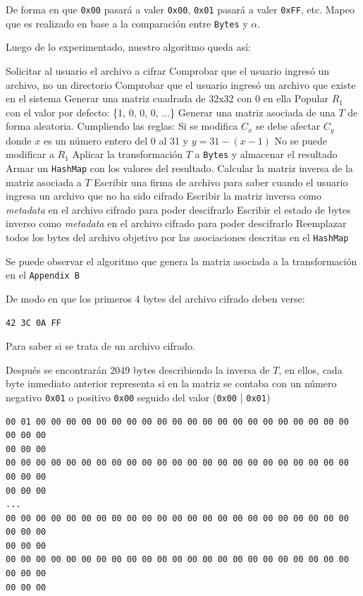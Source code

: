\documentclass[a4paper]{article}
\begin{document}
De forma en que \texttt{0x00} pasará a valer \texttt{0x00}, \texttt{0x01}
pasará a valer \texttt{0xFF}, etc. Mapeo que es realizado en base a la
comparación entre \texttt{Bytes} y $\alpha$.

Luego de lo experimentado, nuestro algoritmo queda así:

\begin{outline}[enumerate]
    \1 Solicitar al usuario el archivo a cifrar
    \1 Comprobar que el usuario ingresó un archivo, no un directorio
    \1 Comprobar que el usuario ingresó un archivo que existe en el sistema
    \1 Generar una matriz cuadrada de 32x32 con 0 en ella
    \1 Popular $R_1$ con el valor por defecto: \{1, 0, 0, 0, ...\}
\1 Generar una matriz asociada de una $T$ de forma aleatoria. Cumpliendo las
reglas:
\2 Si se modifica $C_x$ se debe afectar $C_y$ donde $x$ es un número entero del
0 al 31 y $y = 31 - (x-1)$
        \2 No se puede modificar a $R_1$
    \1 Aplicar la transformación $T$ a \texttt{Bytes} y almacenar el resultado
    \1 Armar un \texttt{HashMap} con los valores del resultado.
    \1 Calcular la matriz inversa de la matriz asociada a $T$
\1 Escribir una firma de archivo para saber cuando el usuario ingresa un
archivo que no ha sido cifrado
\1 Escribir la matriz inversa como \textit{metadata} en el archivo cifrado para
poder descifrarlo
\1 Escribir el estado de bytes inverso como \textit{metadata} en el archivo
cifrado para poder descifrarlo
\1 Reemplazar todos los bytes del archivo objetivo por las asociaciones
descritas en el \texttt{HashMap}
\end{outline}

Se puede observar el algoritmo que genera la matriz asociada a la
transformación en el \texttt{Appendix B}

De modo en que los primeros 4 bytes del archivo cifrado deben verse:

\begin{verbatim}
42 3C 0A FF
\end{verbatim}

Para saber si se trata de un archivo cifrado.

Después se encontrarán 2049 bytes describiendo la inversa de $T$, en ellos,
cada byte inmediato anterior representa si en la matriz se contaba con un
número negativo \texttt{0x01} o positivo \texttt{0x00} seguido del valor
(\texttt{0x00} | \texttt{0x01})

\begin{verbatim}
00 01 00 00 00 00 00 00 00 00 00 00 00 00 00 00 00 00 00 00 00 00 00 00 00 00
00 00 00
00 00 00 00 00 00 00 00 00 00 00 00 00 00 00 00 00 00 00 00 00 00 00 00 00 00
00 00 00
...
00 00 00 00 00 00 00 00 00 00 00 00 00 00 00 00 00 00 00 00 00 00 00 00 00 00
00 00 00
00 00 00 00 00 00 00 00 00 00 00 00 00 00 00 00 00 00 00 00 00 00 00 00 00 00
00 00 00
\end{verbatim}
\end{document}
